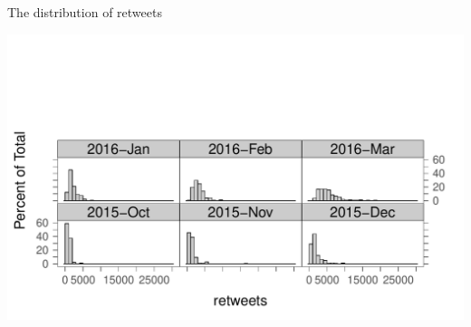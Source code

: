 \documentclass{beamer}\usepackage[]{graphicx}\usepackage[]{color}
\newenvironment{knitrout}{}{} %
\renewenvironment{knitrout}{\begin{spacing}{0.75}\begin{tiny}}{\end{tiny}\end{spacing}}
\begin{document}
\begin{frame}{The distribution of retweets\;\;}
\begin{knitrout}
{\centering \includegraphics[width=1\linewidth]{figure/graphics-unnamed-chunk-7-1} 

}



\end{knitrout}
\end{frame}
\end{document}
